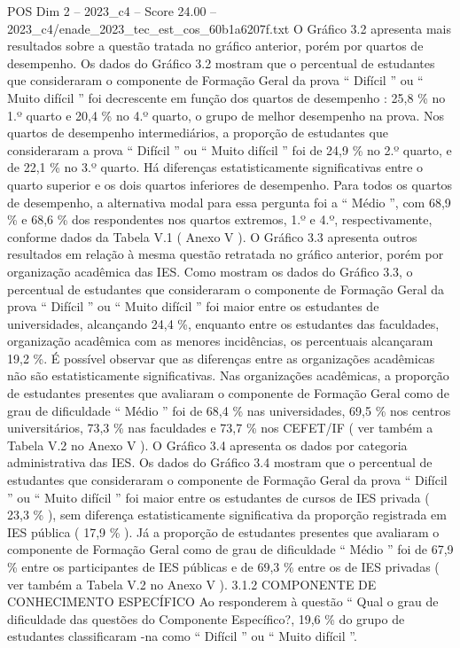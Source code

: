 \begin{textsample}{POS Dim 2 – 2023\_c4 – Score 24.00 – 2023\_c4/enade\_2023\_tec\_est\_cos\_60b1a6207f.txt}
O Gráfico 3.2 apresenta mais resultados sobre a questão tratada no gráfico anterior, porém por quartos de desempenho.
Os dados do Gráfico 3.2 mostram que o percentual de estudantes que consideraram o componente de Formação Geral da prova “ Difícil ” ou “ Muito difícil ” foi decrescente em função dos quartos de desempenho : 25,8 \% no 1.º quarto e 20,4 \% no 4.º quarto, o grupo de melhor desempenho na prova.
Nos quartos de desempenho intermediários, a proporção de estudantes que consideraram a prova “ Difícil ” ou “ Muito difícil ” foi de 24,9 \% no 2.º quarto, e de 22,1 \% no 3.º quarto.
Há diferenças estatisticamente significativas entre o quarto superior e os dois quartos inferiores de desempenho.
Para todos os quartos de desempenho, a alternativa modal para essa pergunta foi a “ Médio ”, com 68,9 \% e 68,6 \% dos respondentes nos quartos extremos, 1.º e 4.º, respectivamente, conforme dados da Tabela V.1 ( Anexo V ).
O Gráfico 3.3 apresenta outros resultados em relação à mesma questão retratada no gráfico anterior, porém por organização acadêmica das IES.
Como mostram os dados do Gráfico 3.3, o percentual de estudantes que consideraram o componente de Formação Geral da prova “ Difícil ” ou “ Muito difícil ” foi maior entre os estudantes de universidades, alcançando 24,4 \%, enquanto entre os estudantes das faculdades, organização acadêmica com as menores incidências, os percentuais alcançaram 19,2 \%.
É possível observar que as diferenças entre as organizações acadêmicas não são estatisticamente significativas.
Nas organizações acadêmicas, a proporção de estudantes presentes que avaliaram o componente de Formação Geral como de grau de dificuldade “ Médio ” foi de 68,4 \% nas universidades, 69,5 \% nos centros universitários, 73,3 \% nas faculdades e 73,7 \% nos CEFET/IF ( ver também a Tabela V.2 no Anexo V ).
O Gráfico 3.4 apresenta os dados por categoria administrativa das IES.
Os dados do Gráfico 3.4 mostram que o percentual de estudantes que consideraram o componente de Formação Geral da prova “ Difícil ” ou “ Muito difícil ” foi maior entre os estudantes de cursos de IES privada ( 23,3 \% ), sem diferença estatisticamente significativa da proporção registrada em IES pública ( 17,9 \% ).
Já a proporção de estudantes presentes que avaliaram o componente de Formação Geral como de grau de dificuldade “ Médio ” foi de 67,9 \% entre os participantes de IES públicas e de 69,3 \% entre os de IES privadas ( ver também a Tabela V.2 no Anexo V ). 3.1.2 COMPONENTE DE CONHECIMENTO ESPECÍFICO Ao responderem à questão “ Qual o grau de dificuldade das questões do Componente Específico?, 19,6 \% do grupo de estudantes classificaram -na como “ Difícil ” ou “ Muito difícil ”.

\end{textsample}
